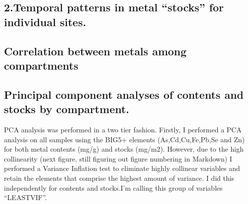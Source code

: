 \documentclass[
]{article}
\begin{document}
\FloatBarrier

\newpage

\hypertarget{temporal-patterns-in-metal-stocks-for-individual-sites.}{%
\subsection{2.Temporal patterns in metal ``stocks'' for individual
sites.}\label{temporal-patterns-in-metal-stocks-for-individual-sites.}}

\newpage

\hypertarget{correlation-between-metals-among-compartments}{%
\subsection{Correlation between metals among
compartments}\label{correlation-between-metals-among-compartments}}

\newpage

\hypertarget{principal-component-analyses-of-contents-and-stocks-by-compartment.}{%
\subsection{Principal component analyses of contents and stocks by
compartment.}\label{principal-component-analyses-of-contents-and-stocks-by-compartment.}}

PCA analysis was performed in a two tier fashion. Firstly, I performed a
PCA analysis on all samples using the BIG5+ elements (As,Cd,Cu,Fe,Pb,Se
and Zn) for both metal contents (mg/g) and stocks (mg/m2). However, due
to the high collinearity (next figure, still figuring out figure
numbering in Markdown) I performed a Variance Inflation test to
eliminate highly collinear variables and retain the elements that
comprise the highest amount of variance. I did this independently for
contents and stocks.I'm calling this group of variables ``LEASTVIF''.
\end{document}
